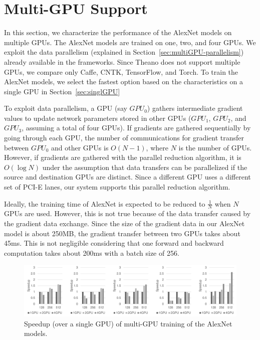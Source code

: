 \section{Multi-GPU Support}
\label{multi-GPU}
In this section, we characterize the performance of the AlexNet models on multiple GPUs. The AlexNet models are trained on one, two, and four GPUs. We exploit the data parallelism (explained in Section~\ref{sec:multiGPU-parallelism}) already available in the frameworks. Since Theano does not support multiple GPUs, we compare only Caffe, CNTK, TensorFlow, and Torch. To train the AlexNet models, we select the fastest option based on the characteristics on a single GPU in Section~\ref{sec:singlGPU}

To exploit data parallelism, a GPU (say $GPU_0$) gathers intermediate gradient values to update network parameters stored in other GPUs ($GPU_1$, $GPU_2$, and $GPU_3$, assuming a total of four GPUs). If gradients are gathered sequentially by going through each GPU, the number of communications for gradient transfer between $GPU_0$ and other GPUs is $O(N-1)$, where $N$ is the number of GPUs. However, if gradients are gathered with the parallel reduction algorithm\cite{harris2007optimizing}, it is $O(\log{N})$ under the assumption that data transfers can be parallelized if the source and destination GPUs are distinct. Since a different GPU uses a different set of PCI-E lanes, our system supports this parallel reduction algorithm.

Ideally, the training time of AlexNet is expected to be reduced to $\frac{1}{N}$ when $N$ GPUs are used. However, this is not true because of the data transfer caused by the gradient data exchange. Since the size of the gradient data in our AlexNet model is about 250MB, the gradient transfer between two GPUs takes about 45ms. This is not negligible considering that one forward and backward computation takes about 200ms with a batch size of 256.

\begin{figure}[htbp]
  \centering
  \includegraphics[width=.9\linewidth]{./figures/MG}
  \subfloat[Caffe]{\makebox[.19\linewidth][]{}}
  \subfloat[Torch]{\makebox[.19\linewidth][]{}}
  \subfloat[TensorFlow]{\makebox[.18\linewidth][]{}}
  \subfloat[CNTK]{\makebox[.18\linewidth][]{}}
\caption{Speedup (over a single GPU) of multi-GPU training of the AlexNet models.}
\label{fig_mg}
\end{figure}

